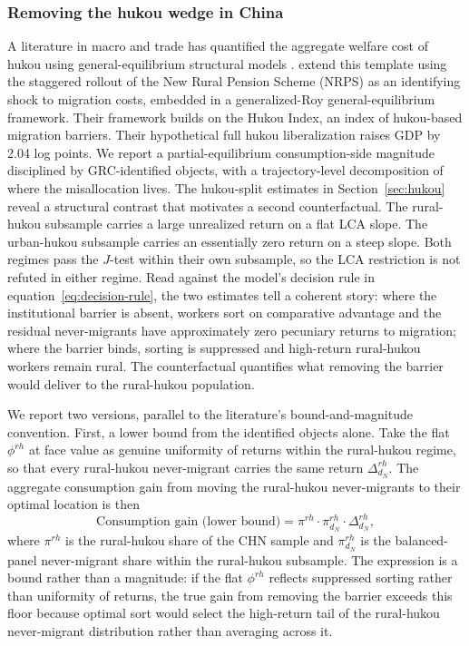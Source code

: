 \subsubsection{Removing the hukou wedge in China}\label{sec:hukou-counterfactual}

A literature in macro and trade has quantified the aggregate welfare cost of hukou using general-equilibrium structural models \citep{tombeTradeMigrationProductivity2019,fanInternalGeographyLabor2019}.
\cite{gaiRuralPensionsLabor2025} extend this template using the staggered rollout of the New Rural Pension Scheme (NRPS) as an identifying shock to migration costs, embedded in a generalized-Roy general-equilibrium framework.
Their framework builds on the \citet{fanInternalGeographyLabor2019} Hukou Index, an index of hukou-based migration barriers.
Their hypothetical full hukou liberalization raises GDP by 2.04 log points.
We report a partial-equilibrium consumption-side magnitude disciplined by GRC-identified objects, with a trajectory-level decomposition of where the misallocation lives.
The hukou-split estimates in Section~\ref{sec:hukou} reveal a structural contrast that motivates a second counterfactual.
The rural-hukou subsample carries a large unrealized return on a flat LCA slope.
The urban-hukou subsample carries an essentially zero return on a steep slope.
Both regimes pass the $J$-test within their own subsample, so the LCA restriction is not refuted in either regime.
Read against the model's decision rule in equation~\eqref{eq:decision-rule}, the two estimates tell a coherent story: where the institutional barrier is absent, workers sort on comparative advantage and the residual never-migrants have approximately zero pecuniary returns to migration; where the barrier binds, sorting is suppressed and high-return rural-hukou workers remain rural.
The counterfactual quantifies what removing the barrier would deliver to the rural-hukou population.

We report two versions, parallel to the literature's bound-and-magnitude convention.
First, a lower bound from the identified objects alone.
Take the flat $\phi^{rh}$ at face value as genuine uniformity of returns within the rural-hukou regime, so that every rural-hukou never-migrant carries the same return $\Delta_{d_N}^{rh}$.
The aggregate consumption gain from moving the rural-hukou never-migrants to their optimal location is then
\begin{equation}\label{eq:hukou-bound}
    \text{Consumption gain (lower bound)} = \pi^{rh} \cdot \pi_{d_N}^{rh} \cdot \Delta_{d_N}^{rh},
\end{equation}
where $\pi^{rh}$ is the rural-hukou share of the CHN sample and $\pi_{d_N}^{rh}$ is the balanced-panel never-migrant share within the rural-hukou subsample.
The expression is a bound rather than a magnitude: if the flat $\phi^{rh}$ reflects suppressed sorting rather than uniformity of returns, the true gain from removing the barrier exceeds this floor because optimal sort would select the high-return tail of the rural-hukou never-migrant distribution rather than averaging across it.

